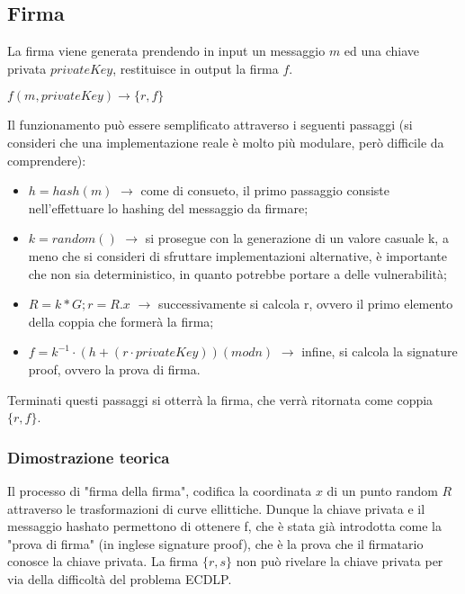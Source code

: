 \newpage

\subsection{Firma}
 
La firma viene generata prendendo in input un messaggio $m$ ed una chiave privata $privateKey$, restituisce in output la firma $f$.

\begin{center}
	$f(m, privateKey) \rightarrow \{r, f\}$
\end{center}

Il funzionamento può essere semplificato attraverso i seguenti passaggi (si consideri che una implementazione reale è molto più modulare, però difficile da comprendere):
\begin{itemize}
	\item $h = hash(m)$  $\rightarrow$ come di consueto, il primo passaggio consiste nell'effettuare lo hashing del messaggio da firmare;
	\item $k = random()$ $\rightarrow$ si prosegue con la generazione di un valore casuale k, a meno che si consideri di sfruttare implementazioni alternative, è importante che non sia deterministico, in quanto potrebbe portare a delle vulnerabilità;
	\item $R = k * G; r = R.x $ $\rightarrow$ successivamente si calcola r, ovvero il primo elemento della coppia che formerà la firma;
	\item $f = k^{-1} \cdot (h + (r \cdot privateKey)) (mod n)$ $\rightarrow$ infine, si calcola la signature proof, ovvero la prova di firma.
\end{itemize}

Terminati questi passaggi si otterrà la firma, che verrà ritornata come coppia $\{r, f\}$.

\subsubsection{Dimostrazione teorica}

Il processo di "firma della firma", codifica la coordinata $x$ di un punto random $R$ attraverso le trasformazioni di curve ellittiche. Dunque la chiave privata e il messaggio hashato permettono di ottenere f, che è stata già introdotta come la "prova di firma" (in inglese signature proof), che è la prova che il firmatario conosce la chiave privata. La firma $\{r, s\}$ non può rivelare la chiave privata per via della difficoltà del problema ECDLP.

